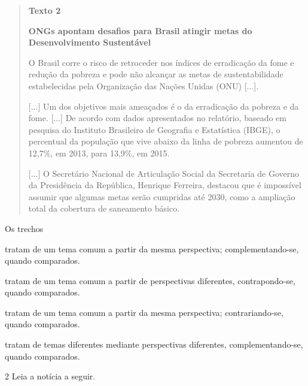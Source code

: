 \begin{quote}
\textbf{Texto 2}

\textbf{ONGs apontam desafios para Brasil atingir metas do
Desenvolvimento Sustentável}

O Brasil corre o risco de retroceder nos índices de erradicação da fome
e redução da pobreza e pode não alcançar as metas de sustentabilidade
estabelecidas pela Organização das Nações Unidas (ONU) {[}...{]}.

{[}...{]} Um dos objetivos mais ameaçados é o da erradicação da pobreza
e da fome. {[}...{]} De acordo com dados apresentados no relatório,
baseado em pesquisa do Instituto Brasileiro de Geografia e Estatística
(IBGE), o percentual da população que vive abaixo da linha de pobreza
aumentou de 12,7\%, em 2013, para 13,9\%, em 2015.

{[}...{]} O Secretário Nacional de Articulação Social da Secretaria de
Governo da Presidência da República, Henrique Ferreira, destacou que é
impossível assumir que algumas metas serão cumpridas até 2030, como a
ampliação total da cobertura de saneamento básico.

\end{quote}

Os trechos

\begin{escolha}
\item tratam de um tema comum a partir da mesma perspectiva;
complementando-se, quando comparados.

\item tratam de um tema comum a partir de perspectivas diferentes,
contrapondo-se, quando comparados.

\item tratam de um tema comum a partir da mesma perspectiva;
contrariando-se, quando comparados.

\item tratam de temas diferentes mediante perspectivas diferentes,
complementando-se, quando comparados.
\end{escolha}

\num{2} Leia a notícia a seguir.

